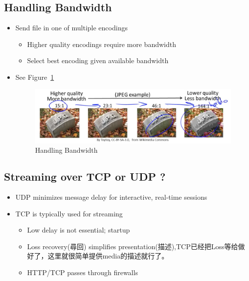 \documentclass[12pt]{ctexart}   %
\begin{document}
	\subsection{Handling Bandwidth}
	\begin{itemize}
		\item Send file in one of multiple encodings
		\begin{itemize}
			\item Higher quality encodings require more bandwidth
			\item Select best encoding given available bandwidth
		\end{itemize}
		\item See Figure~\ref{fig:9-3-4}
		  
		 \begin{figure}[h!] %
		\centering
		 \includegraphics[scale=0.7]{images/9-3-4}
		\caption{ Handling Bandwidth }
		 \label{fig:9-3-4}
		 \end{figure}
	\end{itemize}	
	
	\subsection{Streaming over TCP or UDP ?}
	\begin{itemize}
		\item UDP minimizes message delay for interactive, real-time sessions
		\item TCP is typically used for streaming
		\begin{itemize}
			\item Low delay is not essential; startup
			\item Loss recovery(尋回) simplifies presentation(描述),TCP已经把Loss等给做好了，这里就很简单提供media的描述就行了。
			\item HTTP/TCP passes through firewalls
		\end{itemize}
	\end{itemize}
	
\end{document}
